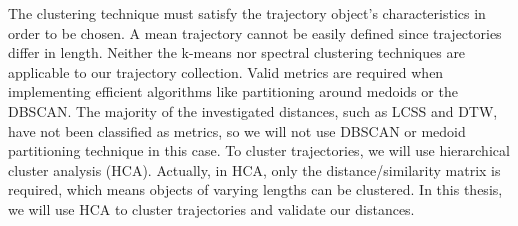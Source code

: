 \documentclass[a4paper, 12pt]{article}
\begin{document}







The clustering technique must satisfy the trajectory object's characteristics in order to be chosen. A mean trajectory cannot be easily defined since trajectories differ in length. Neither the k-means nor spectral clustering techniques are applicable to our trajectory collection. Valid metrics are required when implementing efficient algorithms like partitioning around medoids or the DBSCAN. The majority of the investigated distances, such as LCSS and DTW, have not been classified as metrics, so we will not use DBSCAN or medoid partitioning technique in this case. To cluster trajectories, we will use hierarchical cluster analysis (HCA). Actually, in HCA, only the distance/similarity matrix is required, which means objects of varying lengths can be clustered. In this thesis, we will use HCA to cluster trajectories and validate our distances.
\end{document}
